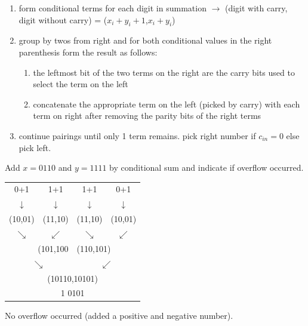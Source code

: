 \begin{enumerate}
    \item form conditional terms for each digit in summation $\rightarrow$ (digit with carry, digit without carry) = ($x_i+y_i+1$,$x_i+y_i$)
    \item group by twos from right and for both conditional values in the right parenthesis form the result as follows:
    \begin{enumerate}
        \item the leftmost bit of the two terms on the right are the carry bits used to select the term on the left
        \item concatenate the appropriate term on the left (picked by carry) with each term on right after removing the parity bits of the right terms
    \end{enumerate}
    \item continue pairings until only 1 term remains. pick right number if $c_{in}=0$ else pick left.
\end{enumerate}

\begin{example}
 Add $x=0110$ and $y=1111$ by conditional sum and indicate if overflow occurred.

        {\color{ans}
        \begin{tabular}{cccc}
          0+1 & 1+1 & 1+1 & 0+1 \\
          $\downarrow$ & $\downarrow$ & $\downarrow$ & $\downarrow$ \\
          (10,01) & (11,10) & (11,10) & (10,01) \\
          $\searrow$ & $\swarrow$ & $\searrow$ & $\swarrow$ \\
          \multicolumn{2}{r}{(101,100} & \multicolumn{2}{l}{(110,101)} \\
          \multicolumn{2}{c}{$\searrow$} & \multicolumn{2}{c}{$\swarrow$} \\
          \multicolumn{4}{c}{(10110,10101)} \\
          \multicolumn{4}{c}{1 0101} \\
        \end{tabular}

        No overflow occurred (added a positive and negative number).
        }
\end{example}



